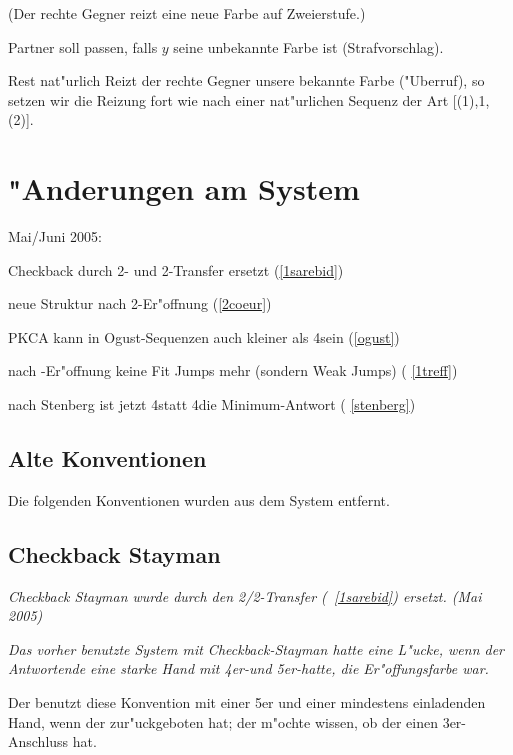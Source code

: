\begin{appendix}
		(Der rechte Gegner reizt eine neue Farbe auf Zweierstufe.)
		\bdsc
			\item[\kontra] Partner soll passen, falls $y$ seine
unbekannte Farbe ist (Strafvorschlag).
			\item[Rest] nat"urlich
		\edsc
\edsc
Reizt der rechte Gegner unsere bekannte Farbe ("Uberruf), so setzen wir die
Reizung fort wie nach einer nat"urlichen Sequenz der Art
[(1\coe{})\sep1\pik{}\sep(2\pik)].

\section{"Anderungen am System}

Mai/Juni 2005:
\begin{compactitem}
\item Checkback durch 2\tre- und 2\SA-Transfer ersetzt (\ra \ref{1sarebid})
\item neue Struktur nach 2\coe-Er"offnung (\ra \ref{2coeur})
\item PKCA kann in Ogust-Sequenzen auch kleiner als 4\tre sein (\ra \ref{ogust})
\item nach \ufa-Er"offnung keine Fit Jumps mehr (sondern Weak Jumps) (\ra
\ref{1treff})
\item nach Stenberg ist jetzt 4\tre statt 4\of die Minimum-Antwort (\ra
\ref{stenberg})
\end{compactitem}

\subsection{Alte Konventionen}

Die folgenden Konventionen wurden aus dem System entfernt.

\subsection*{Checkback Stayman}

\emph{Checkback Stayman wurde durch den 2\tre/2\SA-Transfer (\ra~\ref{1sarebid})
ersetzt. (Mai 2005)}

\emph{Das vorher benutzte System mit Checkback-Stayman hatte eine L"ucke, wenn
der Antwortende
eine starke Hand mit 4er-\ofa und 5er-\ufa hatte, die Er"offungsfarbe war.}

Der \aw benutzt diese Konvention mit einer 5er \ofa und einer mindestens
einladenden Hand, wenn der \SA zur"uckgeboten hat; der \aw m"ochte
wissen, ob der \eo einen 3er-Anschluss hat.


\end{appendix}
